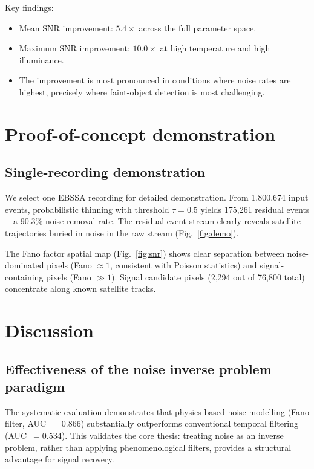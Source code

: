 \documentclass[twocolumn]{article}
\begin{document}
Key findings:
\begin{itemize}
  \item Mean SNR improvement: $5.4\times$ across the full parameter space.
  \item Maximum SNR improvement: $10.0\times$ at high temperature and high illuminance.
  \item The improvement is most pronounced in conditions where noise rates are highest, precisely where faint-object detection is most challenging.
\end{itemize}


\section{Proof-of-concept demonstration}
\label{sec:demo}

\subsection{Single-recording demonstration}

We select one EBSSA recording for detailed demonstration.
From 1,800,674 input events, probabilistic thinning with threshold $\tau = 0.5$ yields 175,261 residual events---a 90.3\% noise removal rate.
The residual event stream clearly reveals satellite trajectories buried in noise in the raw stream (Fig.~\ref{fig:demo}).

The Fano factor spatial map (Fig.~\ref{fig:snr}) shows clear separation between noise-dominated pixels (Fano $\approx 1$, consistent with Poisson statistics) and signal-containing pixels (Fano $\gg 1$).
Signal candidate pixels (2,294 out of 76,800 total) concentrate along known satellite tracks.


\section{Discussion}
\label{sec:discussion}

\subsection{Effectiveness of the noise inverse problem paradigm}

The systematic evaluation demonstrates that physics-based noise modelling (Fano filter, AUC~$= 0.866$) substantially outperforms conventional temporal filtering (AUC~$= 0.534$).
This validates the core thesis: treating noise as an inverse problem, rather than applying phenomenological filters, provides a structural advantage for signal recovery.
\end{document}
